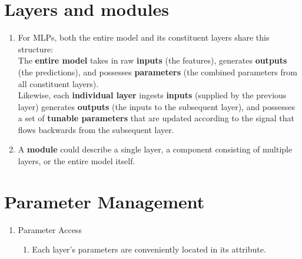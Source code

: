 \section{Layers and modules \cite{dnn-1}}

\begin{enumerate}
    \item For MLPs, both the entire model and its constituent layers share this structure:\\
    The \textbf{entire model} takes in raw \textbf{inputs} (the features), generates \textbf{outputs} (the predictions), and possesses \textbf{parameters} (the combined parameters from all constituent layers).\\
    Likewise, each \textbf{individual layer} ingests \textbf{inputs} (supplied by the previous layer) generates \textbf{outputs} (the inputs to the subsequent layer), and possesses a set of \textbf{tunable parameters} that are updated according to the signal that flows backwards from the subsequent layer.

    \item A \textbf{module}  could describe a single layer, a component consisting of multiple layers, or the entire model itself.

    
\end{enumerate}


\section{Parameter Management \cite{dnn-1}}

\begin{enumerate}[itemsep=0.2cm]
    \item Parameter Access
    \begin{enumerate}
        \item Each layer’s parameters are conveniently located in its attribute.

    \end{enumerate}

\end{enumerate}













































